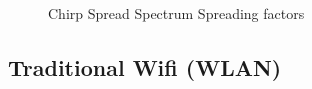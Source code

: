 \documentclass[sigplan,screen,nonacm]{acmart}
\begin{document}
\begin{figure}[htbp]
  \centering
  \caption{Chirp Spread Spectrum Spreading factors\cite{ghoslya2017lora}}
  \label{fig:Chirp}
\end{figure}

\subsection{Traditional Wifi (WLAN)}
\label{subsec:Traditional Wifi (WLAN)}
\end{document}
